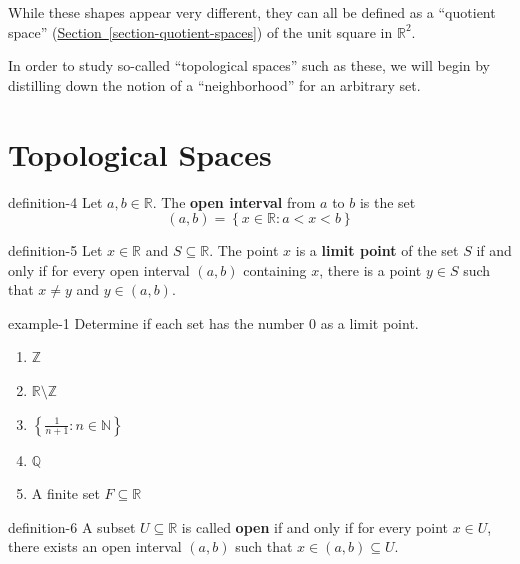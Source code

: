 \documentclass[10pt,]{article}
\newcommand{\terminology}[1]{\textbf{#1}}
\newcommand{\mb}{\mathbb}
\newcommand{\setBuilder}[2]{\left\{#1:#2\right\}}
\newcommand{\lt}{<}
\begin{document}
\hypertarget{p-18}{}%
While these shapes appear very different, they can all be defined as a ``quotient space'' (\hyperref[section-quotient-spaces]{Section~\ref{section-quotient-spaces}}) of the unit square in \(\mathbb R^2\).%
\par
\hypertarget{p-19}{}%
In order to study so-called ``topological spaces'' such as these, we will begin by distilling down the notion of a ``neighborhood'' for an arbitrary set.%
%
%
\typeout{************************************************}
\typeout{************************************************}
%
\section[{Topological Spaces}]{Topological Spaces}\label{section-topological-spaces}
\begin{definition}{}{definition-4}%
\hypertarget{p-20}{}%
Let \(a,b\in\mb R\). The \terminology{open interval} from \(a\) to \(b\) is the set%
%
\begin{equation*}
(a,b)=\setBuilder{x\in\mb R}{a\lt x\lt b}
\end{equation*}
\end{definition}
\begin{definition}{}{definition-5}%
\hypertarget{p-21}{}%
Let \(x\in\mb R\) and \(S\subseteq\mb R\). The point \(x\) is a \terminology{limit point} of the set \(S\) if and only if for every open interval \((a,b)\) containing \(x\), there is a point \(y\in S\) such that \(x\not=y\) and \(y\in(a,b)\).%
\end{definition}
\begin{example}{}{example-1}%
\hypertarget{p-22}{}%
Determine if each set has the number \(0\) as a limit point.%
\leavevmode%
\begin{enumerate}
\item\hypertarget{li-3}{}\(\mb Z\)%
\item\hypertarget{li-4}{}\(\mb R\setminus\mb Z\)%
\item\hypertarget{li-5}{}\(\setBuilder{\frac{1}{n+1}}{n\in\mb N}\)%
\item\hypertarget{li-6}{}\(\mb Q\)%
\item\hypertarget{li-7}{}A finite set \(F\subseteq\mb R\)%
\end{enumerate}
\end{example}
\begin{definition}{}{definition-6}%
\hypertarget{p-23}{}%
A subset \(U\subseteq\mb R\) is called \terminology{open} if and only if for every point \(x\in U\), there exists an open interval \((a,b)\) such that \(x\in(a,b)\subseteq U\).%
\end{definition}
\end{document}
